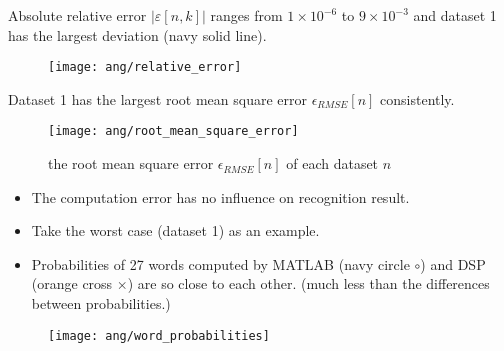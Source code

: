 
\begin{frame}
Absolute relative error $|\varepsilon[n, k]|$ ranges from $1 \times 10^{-6}$ to $9 \times 10^{-3}$ and dataset 1 has the largest deviation (\textcolor{navy_matlab}{navy solid line}).

\begin{figure}[H]
\centering
\texttt{[image: ang/relative\_error]}
\end{figure}
\end{frame}


\begin{frame}
Dataset 1 has the largest root mean square error $\epsilon_{RMSE}[n]$ consistently.

\begin{figure}[H]
\centering
\texttt{[image: ang/root\_mean\_square\_error]}
\caption{the root mean square error $\epsilon_{RMSE}[n]$ of each dataset $n$}
\end{figure}
\end{frame}


\begin{frame}
\begin{itemize}
\item The computation error has no influence on recognition result.
\item Take the worst case (dataset 1) as an example.
\item Probabilities of 27 words computed by MATLAB (\textcolor{navy_matlab}{navy circle $\circ$}) and DSP (\textcolor{orange_matlab}{orange cross $\times$}) are so close to each other. (much less than the differences between probabilities.)
\end{itemize}

\begin{figure}[H]
\centering
\texttt{[image: ang/word\_probabilities]}
\end{figure}
\end{frame}


